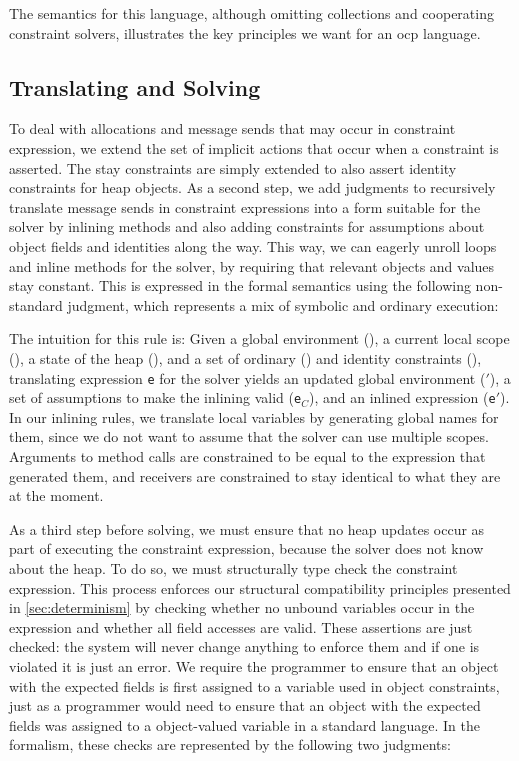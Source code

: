 The semantics for this language, although omitting collections and cooperating
constraint solvers, illustrates the key principles we want for an \ac{ocp}
language.

\subsection{Translating and Solving}

To deal with allocations and message sends that may occur in constraint
expression, we extend the set of implicit actions that occur when a constraint
is asserted. The stay constraints are simply extended to also assert identity
constraints for heap objects. As a second step, we add judgments to recursively
translate message sends in constraint expressions into a form suitable for the
solver by inlining methods and also adding constraints for assumptions about
object fields and identities along the way. This way, we can eagerly unroll
loops and inline methods for the solver, by requiring that relevant objects and
values stay constant. This is expressed in the formal semantics using the
following non-standard judgment, which represents a mix of symbolic and ordinary
execution:


The intuition for this rule is: Given a global environment (\Env), a current
local scope (\Scope), a state of the heap (\Heap), and a set of ordinary
(\Cstore) and identity constraints (\Istore), translating expression \texttt{e}
for the solver yields an updated global environment (\Env$'$), a set of
assumptions to make the inlining valid (\texttt{e$_C$}), and an inlined
expression (\texttt{e$'$}). In our inlining rules, we translate local variables
by generating global names for them, since we do not want to assume that the
solver can use multiple scopes. Arguments to method calls are constrained to be
equal to the expression that generated them, and receivers are constrained to
stay identical to what they are at the moment.

As a third step before solving, we must ensure that no heap updates occur as
part of executing the constraint expression, because the solver does not know
about the heap. To do so, we must structurally type check the constraint
expression. This process enforces our structural compatibility principles
presented in \autoref{sec:determinism} by checking whether no unbound variables
occur in the expression and whether all field accesses are valid. These
assertions are just checked: the system will never change anything to enforce
them and if one is violated it is just an error. We require the programmer to
ensure that an object with the expected fields is first assigned to a variable
used in object constraints, just as a programmer would need to ensure that an
object with the expected fields was assigned to a object-valued variable in a
standard language. In the formalism, these checks are represented by the
following two judgments:

